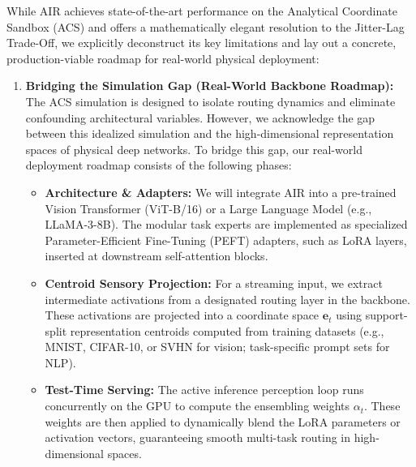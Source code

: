\documentclass{article}
\theoremstyle{plain}
\theoremstyle{definition}
\theoremstyle{remark}
\begin{document}
While AIR achieves state-of-the-art performance on the Analytical Coordinate Sandbox (ACS) and offers a mathematically elegant resolution to the Jitter-Lag Trade-Off, we explicitly deconstruct its key limitations and lay out a concrete, production-viable roadmap for real-world physical deployment:

\begin{enumerate}
    \item \textbf{Bridging the Simulation Gap (Real-World Backbone Roadmap):} The ACS simulation is designed to isolate routing dynamics and eliminate confounding architectural variables. However, we acknowledge the gap between this idealized simulation and the high-dimensional representation spaces of physical deep networks. To bridge this gap, our real-world deployment roadmap consists of the following phases:
    \begin{itemize}
        \item \textbf{Architecture \& Adapters:} We will integrate AIR into a pre-trained Vision Transformer (ViT-B/16) or a Large Language Model (e.g., LLaMA-3-8B). The modular task experts are implemented as specialized Parameter-Efficient Fine-Tuning (PEFT) adapters, such as LoRA layers, inserted at downstream self-attention blocks.
        \item \textbf{Centroid Sensory Projection:} For a streaming input, we extract intermediate activations from a designated routing layer in the backbone. These activations are projected into a coordinate space $\mathbf{e}_t$ using support-split representation centroids computed from training datasets (e.g., MNIST, CIFAR-10, or SVHN for vision; task-specific prompt sets for NLP).
        \item \textbf{Test-Time Serving:} The active inference perception loop runs concurrently on the GPU to compute the ensembling weights $\alpha_t$. These weights are then applied to dynamically blend the LoRA parameters or activation vectors, guaranteeing smooth multi-task routing in high-dimensional spaces.
    \end{itemize}


\end{enumerate}
\end{document}
